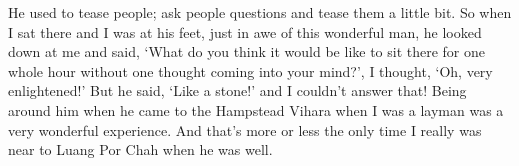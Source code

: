 He used to tease people; ask people questions and tease them a little
bit. So when I sat there and I was at his feet, just in awe of this
wonderful man, he looked down at me and said, `What do you think it
would be like to sit there for one whole hour without one thought coming
into your mind?', I thought, `Oh, very enlightened!' But he said, `Like
a stone!' and I couldn't answer that! Being around him when he came to
the Hampstead Vihara when I was a layman was a very wonderful
experience. And that's more or less the only time I really was near to
Luang Por Chah when he was well. 

